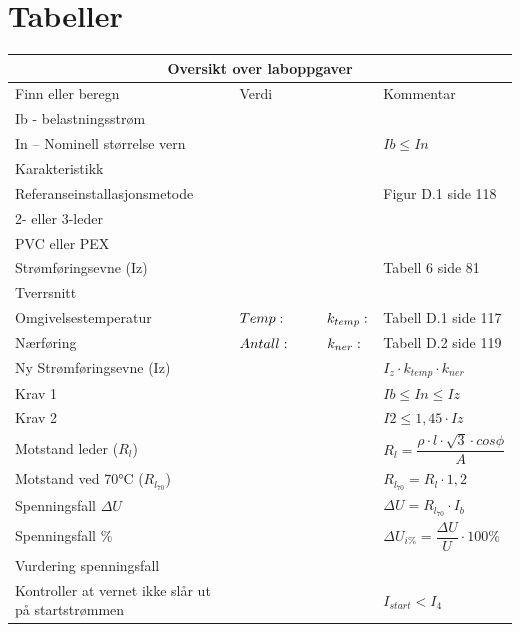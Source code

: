 
\section{Tabeller}

\begin{center}
	\begin{tabular}{| m{4cm} |m{4cm} |m{4cm} |} 
\hline
	\multicolumn{3}{|c|}{\textbf{\cellcolor[HTML]{D5D5D5}Oversikt over laboppgaver}} \\
\hline
\hline
\rowcolor [HTML]{D5D5D5}
Finn eller beregn 		&Verdi				&Kommentar							\\ \cline{1-3}
Ib - belastningsstrøm		&				&								\\ \cline{1-3}
In – Nominell størrelse vern	&				&$Ib \leq In$							\\ \cline{1-3}
Karakteristikk			&				&								\\ \cline{1-3}
Referanseinstallasjonsmetode	&				&Figur D.1 side 118						\\ \cline{1-3}
2- eller 3-leder		&				&								\\ \cline{1-3}
PVC eller PEX			&				&								\\ \cline{1-3}
Strømføringsevne (Iz) 		&				&Tabell 6 side 81						\\ \cline{1-3}
Tverrsnitt			&				&								\\ \cline{1-3}
Omgivelsestemperatur		&$Temp:\hskip 1cm k_{temp}:$	&Tabell D.1 side 117						\\ \cline{1-3}
Nærføring			&$Antall:\hskip 0.9cm k_{ner}:$		&Tabell D.2 side 119					\\ \cline{1-3}
Ny Strømføringsevne (Iz)	& 				&$I_z\cdot k_{temp} \cdot k_{ner}$ 				\\ \cline{1-3}
Krav 1				&				&$Ib \leq In \leq Iz$						\\ \cline{1-3}
Krav 2				&				&$I2 \leq 1,45 \cdot Iz$					\\ \cline{1-3}
Motstand leder ($R_l$) 		&				&$R_l= \dfrac {\rho \cdot l \cdot \sqrt{3} \cdot cos\phi}{A}$ 	\\ \cline{1-3}
Motstand ved 70°C ($R_{l_{70}}$)	&				&$R_{l_{70}}=R_l \cdot 1,2$				\\ \cline{1-3}
Spenningsfall $\Delta U$	&				&$\Delta U=R_{l_{70}} \cdot I_b$				\\ \cline{1-3}
Spenningsfall \%  		&				&$\Delta U_{i \%}= \dfrac{ \Delta U}{U} \cdot 100\%$		\\ \cline{1-3}
Vurdering spenningsfall 	&				&								\\ \cline{1-3}
Kontroller at vernet ikke slår ut på startstrømmen 	& 	&$I_{start}< I_4$						\\ \cline{1-3}

\end{tabular}
\end{center}
